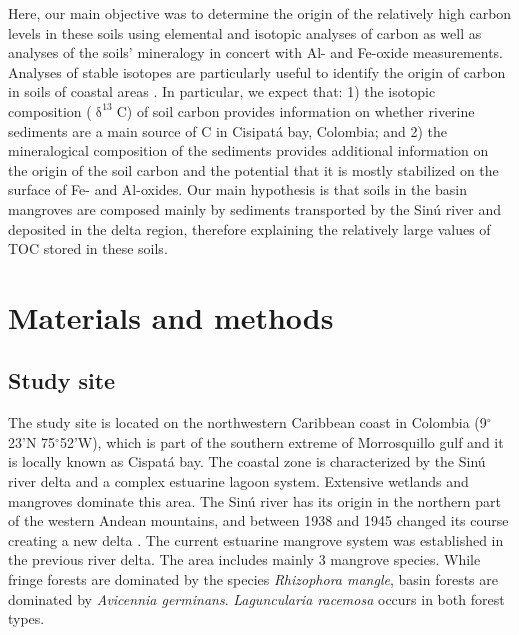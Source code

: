 Here, our main objective was to determine the origin of the relatively high carbon levels in these soils using elemental and isotopic analyses of carbon as well as analyses of the soils' mineralogy in concert with Al- and Fe-oxide measurements. Analyses of stable isotopes are particularly useful to identify the origin of carbon in soils of coastal areas \citep{Bouillion, Spohn2012, Spohn2013}. In particular, we expect that: 1) the isotopic composition ($\updelta ^{13}$C) of soil carbon provides information on whether riverine sediments are a main source of C in Cisipat\'a bay, Colombia; and  2) the mineralogical composition of the sediments provides additional information on the origin of the soil carbon and the potential that it is mostly stabilized on the surface of Fe- and Al-oxides. Our main hypothesis is that soils in the basin mangroves are composed mainly by sediments transported by the Sin\'u river and deposited in the delta region, therefore explaining the relatively large values of TOC stored in these soils. 



\section{Materials and methods} \label{sec:1}
\subsection{Study site}
The study site is located on the northwestern Caribbean coast in Colombia (9$^{\circ}$23'N 75$^{\circ}$52'W), which is part of the southern extreme of Morrosquillo gulf and it is locally known as Cispat\'a bay. The coastal zone is characterized by the Sin\'{u} river delta and a complex estuarine lagoon system. Extensive wetlands and mangroves dominate this area. The Sin\'{u} river has its origin in the northern part of the western Andean mountains, and between 1938 and 1945 changed its course creating a new delta \citep{suarez2004}. The current estuarine mangrove system was established in the previous river delta. 
The area includes mainly 3 mangrove species. While fringe forests are dominated by the species \textit{Rhizophora mangle}, basin forests are dominated by \textit{Avicennia germinans}. \textit{Laguncularia racemosa} occurs in both forest types.


